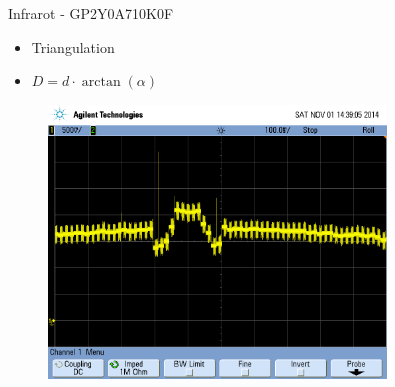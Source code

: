 \begin{frame}
\begin{columns}
        \pause
        \begin{column}{0.5\textwidth}
            \begin{block}{Infrarot - GP2Y0A710K0F}
                \begin{itemize}
                    \item Triangulation
                    \item $D = d \cdot \arctan(\alpha)$
                \end{itemize}
                \pause
                \begin{figure}
                    \includegraphics[width=0.8\textwidth]{../doc/fig/scope_80.png}
                \end{figure}
            \end{block}
        \end{column}
    \end{columns}
\end{frame}

